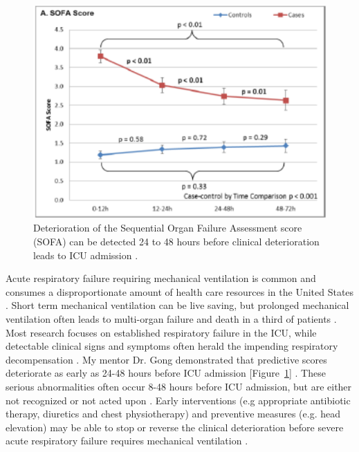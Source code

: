 \documentclass[11pt,notitlepage]{article}
\begin{document}
\begin{figure}
 \vspace{-70pt}
 \includegraphics[scale=0.7]{Figures/SOFA_fig.png}
  \vspace{-30pt}
  \caption{\footnotesize Deterioration of the Sequential Organ Failure Assessment score (SOFA) can be detected 24 to 48 hours before clinical deterioration leads to ICU admission \cite{Yu_24970344}.}
    \label{fig:SOFA_fig}
 \vspace{-20pt}
\end{figure}

Acute respiratory failure requiring mechanical ventilation is common and consumes a disproportionate amount of health care resources in the United States \cite{Wunsch_20639743}. Short term mechanical ventilation can be live saving, but prolonged mechanical ventilation often leads to multi-organ failure and death in a third of patients \cite{Wunsch_20639743, Ranieri_10872010}. Most research focuses on established respiratory failure in the ICU, while detectable clinical signs and symptoms often herald the impending respiratory decompensation \cite{Rohde_23401431}. My mentor Dr. Gong demonstrated that predictive scores deteriorate as early as 24-48 hours before ICU admission  [Figure~\ref{fig:SOFA_fig}] \cite{Yu_24970344}. These serious abnormalities often occur 8-48 hours before ICU admission, but are either not recognized or not acted upon \cite{Hillman_12415452,McQuillan_9632403}. Early interventions (e.g appropriate antibiotic therapy, diuretics and chest physiotherapy) and preventive measures (e.g. head elevation) may be able to stop or reverse the clinical deterioration before severe acute respiratory failure requires mechanical ventilation \cite{Naeem_16150531,Rivers_11794169,Rivers_12594312,Mitchell_20378235}. 
\end{document}
